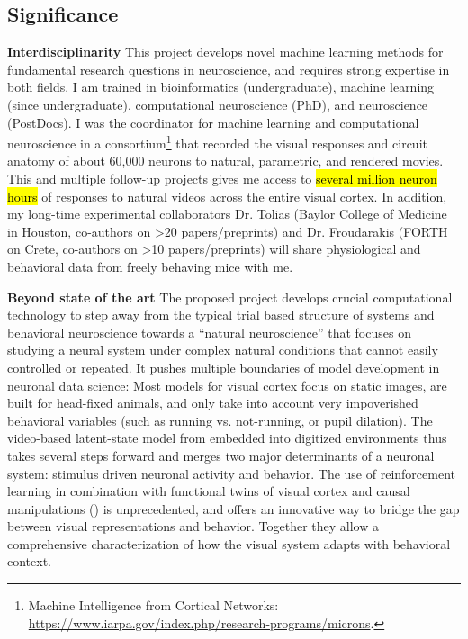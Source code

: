 \documentclass[COG,11pt]{ercgrant}
\begin{document}
\subsection{Significance}

\textbf{Interdisciplinarity} This project develops novel machine learning methods for fundamental research questions in neuroscience, and requires strong expertise in both fields. 
I am trained in bioinformatics (undergraduate), machine learning (since undergraduate), computational neuroscience (PhD), and neuroscience (PostDocs). 
I was the coordinator for machine learning and computational neuroscience in a consortium\footnote{Machine Intelligence from Cortical Networks: \url{https://www.iarpa.gov/index.php/research-programs/microns}.} that recorded the visual responses and circuit anatomy of about 60,000 neurons to natural, parametric, and rendered movies. This and multiple follow-up projects gives me access to \hl{several million neuron hours} of responses to natural videos across the entire visual cortex. In addition, my long-time experimental collaborators Dr. Tolias (Baylor College of Medicine in Houston, co-authors on >20  papers/preprints) and Dr. Froudarakis (FORTH on Crete, co-authors on >10 papers/preprints) will share physiological and behavioral data from freely behaving mice with me. 


\textbf{Beyond state of the art} 
The proposed project develops crucial computational technology to step away from the typical trial based structure of systems and behavioral neuroscience towards a ``natural neuroscience'' that focuses on studying a neural system under complex natural conditions that cannot easily controlled or repeated. 
It pushes multiple boundaries of model development in neuronal data science: Most models for visual cortex focus on static images, are built for head-fixed animals, and only take into account very impoverished behavioral variables (such as running vs. not-running, or pupil dilation). The video-based latent-state model from  embedded into digitized environments 
thus takes several steps forward and merges two major determinants of a neuronal system: stimulus driven neuronal activity and behavior.  The use of reinforcement learning in combination with functional twins of visual cortex and causal manipulations () is unprecedented, and offers an innovative way to bridge the gap between visual representations and behavior.  Together they allow a comprehensive characterization of how the visual system adapts with behavioral context. 
\end{document}
